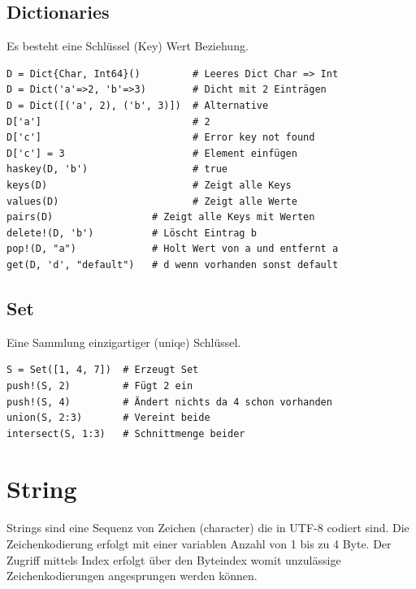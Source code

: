 \documentclass[10pt,twocolumn]{scrartcl}
\begin{document}
\subsection{Dictionaries}
\label{ssec:dictionary}

Es besteht eine Schlüssel (Key) Wert Beziehung.

\begin{lstlisting}
D = Dict{Char, Int64}()         # Leeres Dict Char => Int
D = Dict('a'=>2, 'b'=>3)        # Dicht mit 2 Einträgen
D = Dict([('a', 2), ('b', 3)])  # Alternative
D['a']                          # 2
D['c']                          # Error key not found
D['c'] = 3                      # Element einfügen
haskey(D, 'b')                  # true
keys(D)                         # Zeigt alle Keys
values(D)                       # Zeigt alle Werte
pairs(D)                 # Zeigt alle Keys mit Werten
delete!(D, 'b')          # Löscht Eintrag b
pop!(D, "a")             # Holt Wert von a und entfernt a
get(D, 'd', "default")   # d wenn vorhanden sonst default
\end{lstlisting}

\subsection{Set}
\label{ssec:set}

Eine Sammlung einzigartiger (uniqe) Schlüssel.

\begin{lstlisting}
S = Set([1, 4, 7])  # Erzeugt Set
push!(S, 2)         # Fügt 2 ein
push!(S, 4)         # Ändert nichts da 4 schon vorhanden
union(S, 2:3)       # Vereint beide
intersect(S, 1:3)   # Schnittmenge beider
\end{lstlisting}

\section{String}
\label{sec:string}

Strings sind eine Sequenz von Zeichen (character) die in UTF-8 codiert sind. Die
Zeichenkodierung erfolgt mit einer variablen Anzahl von 1 bis zu 4 Byte. Der
Zugriff mittels Index erfolgt über den Byteindex womit unzulässige
Zeichenkodierungen angesprungen werden können.
\end{document}
